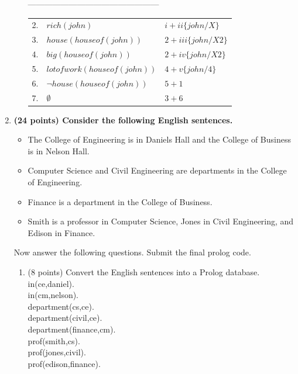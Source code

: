 \documentclass{article}%
\begin{document}
\begin{enumerate}
\begin{enumerate}
		------------------------------------------------\\
		\begin{tabular}{c|p{8cm}|l}
		2. & $ rich(john) $ &  $i + ii \lbrace john / X \rbrace$ \\
		3. & $ house(houseof(john)) $ &  $2+ iii \lbrace john / X2 \rbrace$ \\
		4. &$ big(houseof(john))$& $2 + iv \lbrace john / X2 \rbrace$\\
		5. & $ lotofwork(houseof(john)) $ &$ 4 + v \lbrace john / 4 \rbrace$\\
		6. & $ \neg house(houseof(john)) $ &$ 5 + 1 $\\
		7. & $ \emptyset  $ &$ 3 + 6$\\
		\end{tabular} 
	\end{enumerate}
	
\item \textbf{(24 points) Consider the following English sentences.}

	\begin{itemize}
	\item The College of Engineering is in Daniels Hall and the College of Business is in Nelson Hall.
	\item Computer Science and Civil Engineering are departments in the College of Engineering.
	\item Finance is a department in the College of Business.
	\item Smith is a professor in Computer Science, Jones in Civil Engineering, and Edison in Finance.
	\end{itemize}

Now answer the following questions. Submit the final prolog code.

	\begin{enumerate}
	\item (8 points) Convert the English sentences into a Prolog database. \\
	in(ce,daniel). \\
in(cm,nelson). \\
department(cs,ce). \\
department(civil,ce). \\
department(finance,cm). \\
prof(smith,cs). \\
prof(jones,civil). \\
prof(edison,finance). \\




\end{enumerate}
\end{enumerate}
\end{document}
